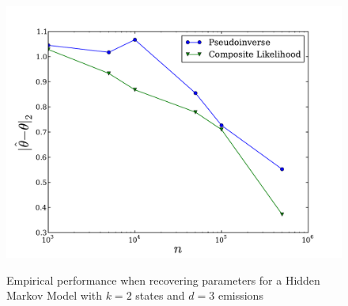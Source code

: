 
\begin{figure}
  \centering
  \includegraphics[width=\columnwidth]{figures/hmm-2-3.pdf}
    \label{fig:cl-hmm}
  \caption{Empirical performance when recovering parameters for a Hidden Markov Model with $k=2$ states and $d=3$ emissions}
\end{figure}

